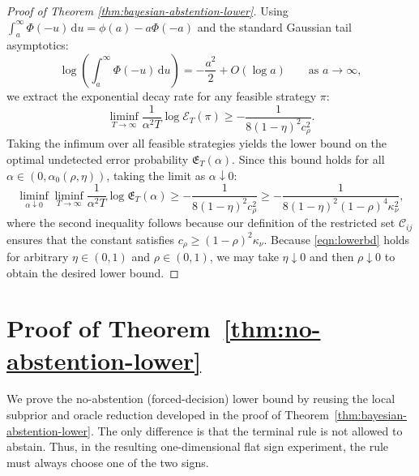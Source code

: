 \documentclass[10pt]{article}
\newcommand{\dd}{\mathrm{d}}
\theoremstyle{plain}
\begin{document}
\begin{proof}[Proof of Theorem \ref{thm:bayesian-abstention-lower}]
Using $\int_a^\infty \Phi(-u)\,\dd u = \phi(a)-a\Phi(-a)$ and the standard Gaussian tail asymptotics:
$$ \log\left(\int_a^\infty \Phi(-u)\,\dd u\right) = -\frac{a^2}{2} + O(\log a) \qquad \text{as } a \to \infty, $$
we extract the exponential decay rate for any feasible strategy $\pi$:
$$ \liminf_{T\to\infty} \frac{1}{\alpha^2 T} \log \mathcal{E}_T(\pi) \ge -\frac{1}{8(1-\eta)^2 c_\rho^2}. $$
Taking the infimum over all feasible strategies yields the lower bound on the optimal undetected error probability $\mathfrak{E}_{T}(\alpha)$. Since this bound holds for all $\alpha \in (0, \alpha_0(\rho,\eta))$, taking the limit as $\alpha \downarrow 0$:
\begin{equation}
    \liminf_{\alpha\downarrow 0} \liminf_{T\to\infty} \frac{1}{\alpha^2 T} \log \mathfrak{E}_{T}(\alpha) \ge -\frac{1}{8(1-\eta)^2 c_\rho^2} 
\ge -\frac{1}{8(1-\eta)^2 (1-\rho)^4 \kappa_\nu^2}, \label{eqn:lowerbd}
\end{equation}
where the second inequality follows because our definition of the restricted set $\mathcal C_{ij}$ ensures that the constant satisfies $c_\rho \ge (1-\rho)^2 \kappa_\nu$.
Because \eqref{eqn:lowerbd} holds for arbitrary $\eta \in (0,1)$ and $\rho \in (0,1)$, we may take $\eta \downarrow 0$ and then $\rho \downarrow 0$ to obtain the desired lower bound.   
\end{proof}























\section{Proof of Theorem~\ref{thm:no-abstention-lower}}
\label{app:no-abstention-lower}

We prove the no-abstention (forced-decision) lower bound by reusing the local subprior and
oracle reduction developed in the proof of
Theorem~\ref{thm:bayesian-abstention-lower}. The only difference is that the
terminal rule is not allowed to abstain. Thus, in the resulting one-dimensional
flat sign experiment, the rule must always choose one of the two signs.
\end{document}
